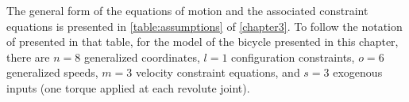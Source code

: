 The general form of the equations of motion and the associated constraint
equations is presented in \autoref{table:assumptions} of \autoref{chapter3}. To
follow the notation of presented in that table, for the model of the bicycle
presented in this chapter, there are $n=8$ generalized coordinates, $l=1$
configuration constraints, $o=6$ generalized speeds, $m=3$ velocity constraint
equations, and $s=3$ exogenous inputs (one torque applied at each revolute
joint).


